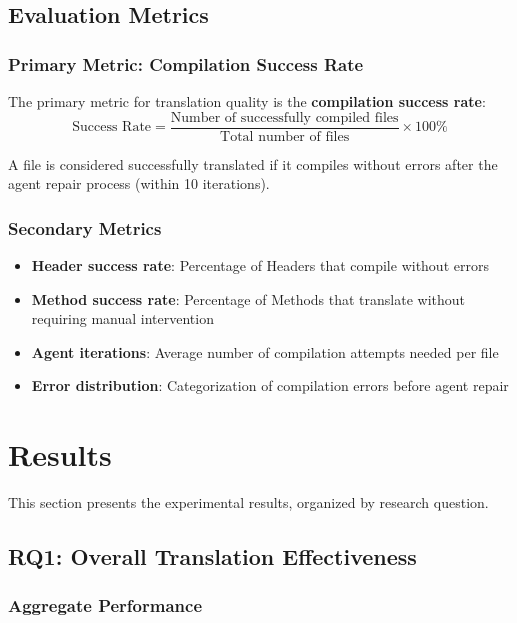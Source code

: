 \subsection{Evaluation Metrics}

\subsubsection{Primary Metric: Compilation Success Rate}

The primary metric for translation quality is the \textbf{compilation success rate}:
\[
\text{Success Rate} = \frac{\text{Number of successfully compiled files}}{\text{Total number of files}} \times 100\%
\]

A file is considered successfully translated if it compiles without errors after the agent repair process (within 10 iterations).

\subsubsection{Secondary Metrics}

\begin{itemize}
\item \textbf{Header success rate}: Percentage of Headers that compile without errors
\item \textbf{Method success rate}: Percentage of Methods that translate without requiring manual intervention
\item \textbf{Agent iterations}: Average number of compilation attempts needed per file
\item \textbf{Error distribution}: Categorization of compilation errors before agent repair
\end{itemize}

\section{Results}

This section presents the experimental results, organized by research question.

\subsection{RQ1: Overall Translation Effectiveness}

\subsubsection{Aggregate Performance}

